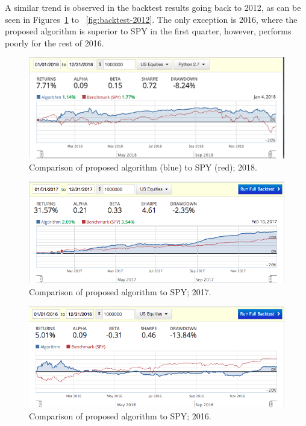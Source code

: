 \documentclass{article}
\begin{document}
\begin{case}
A similar trend is observed in the backtest results going back to
2012, as can be seen in Figures~\ref{fig:backtest-2018} to
~\ref{fig:backtest-2012}. The only exception is 2016, where the
proposed algorithm is superior to SPY in the first quarter, however,
performs poorly for the rest of 2016.

\begin{figure}\label{fig:backtest-2018}
\includegraphics[bb=0 0 640 480]{figures/mad_mfd_macd_2018.png}
\caption{Comparison of proposed algorithm (blue) to SPY (red); 2018.}  
\end{figure}

\begin{figure}\label{fig:backtest-2017}
\includegraphics[bb=0 0 640 480]{figures/mad_mfd_macd_2017.png}
\caption{Comparison of proposed algorithm to SPY; 2017.}  
\end{figure}

\begin{figure}\label{fig:backtest-2016}
\includegraphics[bb=0 0 640 480]{figures/mad_mfd_macd_2016.png}
\caption{Comparison of proposed algorithm to SPY; 2016.}  
\end{figure}


\end{case}
\end{document}
